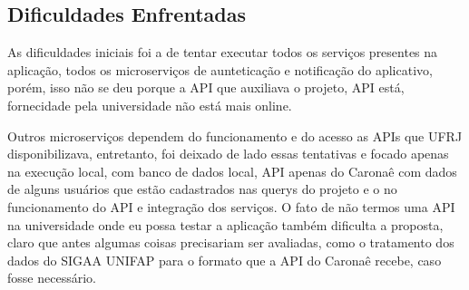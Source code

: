 \subsection{Dificuldades Enfrentadas}

As dificuldades iniciais foi a de tentar executar todos os serviços presentes na aplicação, todos os microserviços de aunteticação e notificação do aplicativo, porém, isso não se deu porque a API que auxiliava o projeto, API está, fornecidade pela universidade não está mais online.

Outros microserviços dependem do funcionamento e do acesso as APIs que UFRJ disponibilizava, entretanto, foi deixado de lado essas tentativas e focado apenas na execução local, com banco de dados local, API apenas do Caronaê com dados de alguns usuários que estão cadastrados nas querys do projeto e o no funcionamento do API e integração dos serviços. O fato de não termos uma API na universidade onde eu possa testar a aplicação também dificulta a proposta, claro que antes algumas coisas precisariam ser avaliadas, como o tratamento dos dados do SIGAA UNIFAP para o formato que a API do Caronaê recebe, caso fosse necessário.

